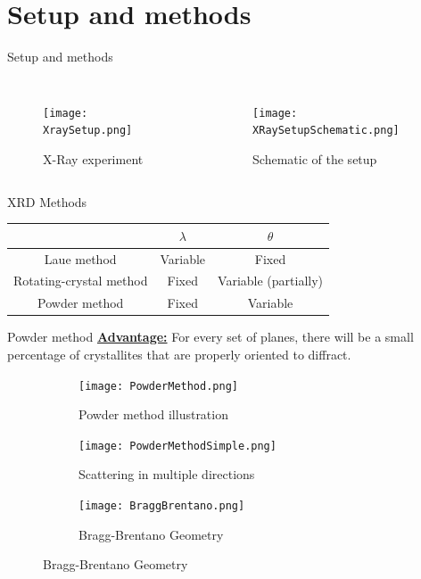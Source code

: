 \documentclass{beamer}
\begin{document}
\section{Setup and methods}

\begin{frame}{Setup and methods}
    \begin{columns}
        \begin{figure}
            \centering
            \texttt{[image: XraySetup.png]}
            \caption{X-Ray experiment}
        \end{figure}
        \begin{figure}
            \centering
            \texttt{[image: XRaySetupSchematic.png]}
            \caption{Schematic of the setup}
        \end{figure}
    \end{columns}
    \vspace{-0.4cm}
    \begin{exampleblock}{XRD Methods}
        \begin{table}
            \centering
            \begin{tabular}{ccc}
                ~ & $\lambda$ & $\theta$ \\ \hline
                Laue method & Variable & Fixed \\
                Rotating-crystal method & Fixed & Variable (partially) \\
                Powder method & Fixed & Variable
            \end{tabular}
        \end{table}
    \end{exampleblock}
\end{frame}

\begin{frame}{Powder method}
    \underline{\textbf{Advantage:}} For every set of planes, there will be a small percentage of crystallites that are properly oriented to diffract.
    \vspace{1cm}
    \begin{figure}
        \centering
        \begin{subfigure}[c]{0.5\textwidth}
        \texttt{[image: PowderMethod.png]}
        \caption{Powder method illustration}
        \end{subfigure} \hfill
        \begin{subfigure}[c]{0.24\textwidth}
            \texttt{[image: PowderMethodSimple.png]}
            \caption{Scattering in multiple directions}
        \end{subfigure} \hfill
        \begin{subfigure}[c]{0.24\textwidth}
        \texttt{[image: BraggBrentano.png]}
        \caption{Bragg-Brentano Geometry}
        \end{subfigure}
    \end{figure}
\end{frame}
\end{document}
